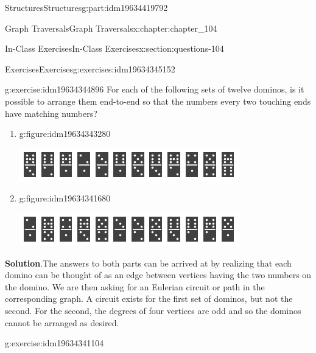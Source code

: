 \documentclass[oneside,10pt,]{book}
\newcommand{\blocktitlefont}{\relax}
\numberwithin{equation}{section}
\begin{document}
\begin{partptx}{Structures}{}{Structures}{}{}{g:part:idm19634419792}
\begin{chapterptx}{Graph Traversals}{}{Graph Traversals}{}{}{x:chapter:chapter_104}
\begin{sectionptx}{In-Class Exercises}{}{In-Class Exercises}{}{}{x:section:questions-104}
\typeout{************************************************}
%
\begin{exercises-subsection-numberless}{Exercises}{}{Exercises}{}{}{g:exercises:idm19634345152}
\par\medskip\noindent%
%
\begin{exercisegroup}
\begin{divisionexerciseeg}{1}{}{}{g:exercise:idm19634344896}%
For each of the following sets of twelve dominos, is it possible to arrange them end-to-end so that the numbers every two touching ends have matching numbers?%
\begin{enumerate}[label=(\alph*)]
\item{}\begin{figureptx}{}{g:figure:idm19634343280}{}%
\begin{image}{0}{1}{0}%
\includegraphics[width=\linewidth]{images/dominos1.png}
\end{image}%
\tcblower
\end{figureptx}%
%
\item{}\begin{figureptx}{}{g:figure:idm19634341680}{}%
\begin{image}{0}{1}{0}%
\includegraphics[width=\linewidth]{images/dominos2.png}
\end{image}%
\tcblower
\end{figureptx}%
%
\end{enumerate}
%
\par\smallskip%
\noindent\textbf{\blocktitlefont Solution}.\hypertarget{g:solution:idm19634346304}{}\quad{}The answers to both parts can be arrived at by realizing that each domino can be thought of as an edge between vertices having the two numbers on the domino.  We are then asking for an Eulerian circuit or path in the corresponding graph.  A circuit exists  for the first set of dominos, but not the second. For the second, the degrees of four vertices are odd and so the dominos cannot be arranged as desired.%
\end{divisionexerciseeg}%
\begin{divisionexerciseeg}{2}{}{}{g:exercise:idm19634341104}%

\end{divisionexerciseeg}
\end{exercisegroup}
\end{exercises-subsection-numberless}
\end{sectionptx}
\end{chapterptx}
\end{partptx}
\end{document}
